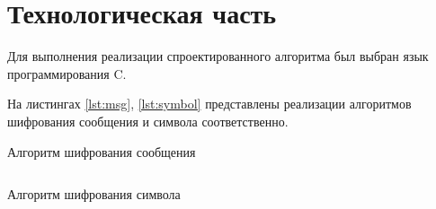 \section{Технологическая часть}

Для выполнения реализации спроектированного алгоритма был выбран язык программирования C.

На листингах \ref{lst:msg}, \ref{lst:symbol} представлены реализации алгоритмов шифрования сообщения и символа соответственно.

\begin{listing}[H]
	\caption{Алгоритм шифрования сообщения}
	\inputminted[frame=single,fontsize = \footnotesize, linenos, breaklines, xleftmargin = 1.5em,breaksymbol = ""]{C}{../lst/msg.c}
	\label{lst:msg}
\end{listing}

\begin{listing}[H]
	\caption{Алгоритм шифрования символа}
	\inputminted[frame=single,fontsize = \footnotesize, linenos, breaklines, xleftmargin = 1.5em,breaksymbol = ""]{C}{../lst/symbol.c}
	\label{lst:symbol}
\end{listing}
